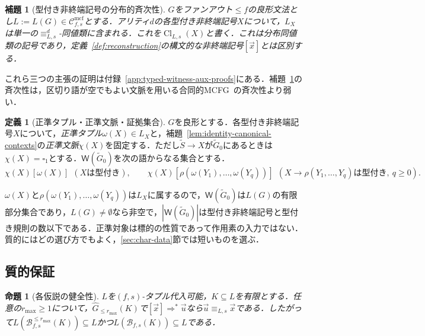 \documentclass[11pt,a4paper]{ltjsarticle}
\numberwithin{equation}{section}
\theoremstyle{plain}
\newtheorem{lemma}[theorem]{補題}
\newtheorem{proposition}[theorem]{命題}
\theoremstyle{definition}
\newtheorem{definition}[theorem]{定義}
\theoremstyle{remark}
\newcommand{\Wit}{\mathsf{W}}
\newcommand{\Cmcf}[2]{\mathcal{C}^{\mathrm{mcf}}_{#1,#2}}
\newcommand{\tuple}[1]{\vec{#1}}
\newcommand{\blank}{\square}
\begin{document}
\begin{lemma}[型付き非終端記号の分布的斉次性]
\label{lem:typed-homogeneity}
$G$をファンアウト$\le f$の良形文法とし$L:=L(G)\in\Cmcf{f}{s}$とする．アリティ$d$の各型付き非終端記号$X$について，$L_X$は単一の$\equiv_{L,s}^d$-同値類に含まれる．これを$\operatorname{Cl}_{L,s}(X)$と書く．これは分布同値類の記号であり，定義~\ref{def:reconstruction}の構文的な非終端記号$[\tuple x]$とは区別する．
\end{lemma}

これら三つの主張の証明は付録~\ref{app:typed-witness-aux-proofs}にある．補題~\ref{lem:typed-homogeneity}の斉次性は，区切り語が空でもよい文脈を用いる合同的MCFG~\cite{ClarkYoshinaka2016}の斉次性より弱い．

\begin{definition}[正準タプル・正準文脈・証拠集合]
\label{def:target-canonical}
\label{def:witness-set}
$G$を良形とする．各型付き非終端記号$X$について，\emph{正準タプル}$\omega(X)\in L_X$と，補題~\ref{lem:identity-canonical-contexts}の\emph{正準文脈}$\chi(X)$を固定する．ただし$\widetilde S\to X$が$\widetilde G_0$にあるときは$\chi(X)=\blank_1$とする．$\Wit(\widetilde G_0)$を次の語からなる集合とする．
\[
 \chi(X)[\omega(X)]\ \ (X\text{は型付き}),\qquad
 \chi(X)[\rho(\omega(Y_1),\ldots,\omega(Y_q))]\ \
 (X\to\rho(Y_1,\ldots,Y_q)\text{は型付き},\ q\ge0).
\]
\end{definition}

$\omega(X)$と$\rho(\omega(Y_1),\ldots,\omega(Y_q))$は$L_X$に属するので，$\Wit(\widetilde G_0)$は$L(G)$の有限部分集合であり，$L(G)\ne\emptyset$なら非空で，$|\Wit(\widetilde G_0)|$は型付き非終端記号と型付き規則の数以下である．正準対象は標的の性質であって作用素の入力ではない．質的にはどの選び方でもよく，\ref{sec:char-data}節では短いものを選ぶ．

\subsection{質的保証}
\label{sec:completeness}
\label{sec:poly-time}

\begin{proposition}[各仮説の健全性]
\label{prop:reconstruction-soundness}
$L$を$(f,s)$-タプル代入可能，$K\subseteq L$を有限とする．任意の$r_{\max}\ge1$について，$\widehat G_{\le r_{\max}}(K)$で$[\tuple x]\Rightarrow^*\tuple u$なら$\tuple u\equiv_{L,s}\tuple x$である．したがって$L(\mathcal B_{f,s}^{\le r_{\max}}(K))\subseteq L$かつ$L(\mathcal B_{f,s}(K))\subseteq L$である．
\end{proposition}
\end{document}
